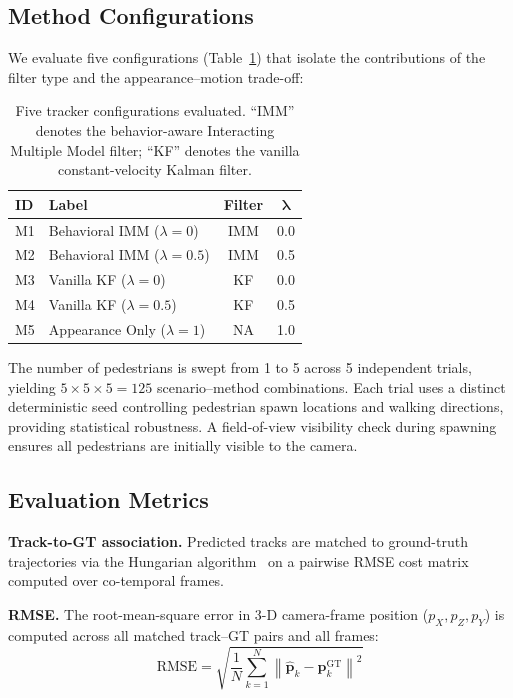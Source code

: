 \documentclass[conference]{IEEEtran}
\begin{document}
\subsection{Method Configurations}
We evaluate five configurations (Table~\ref{tab:methods}) that isolate the contributions of the filter type and the appearance--motion trade-off:

\begin{table}[!t]
\centering
\caption{Five tracker configurations evaluated. ``IMM'' denotes the behavior-aware Interacting Multiple Model filter; ``KF'' denotes the vanilla constant-velocity Kalman filter.}
\label{tab:methods}
\begin{tabular}{@{}llcc@{}}
\toprule
\textbf{ID} & \textbf{Label} & \textbf{Filter} & $\bm{\lambda}$ \\
\midrule
M1 & Behavioral IMM ($\lambda{=}0$)    & IMM & 0.0 \\
M2 & Behavioral IMM ($\lambda{=}0.5$)  & IMM & 0.5 \\
M3 & Vanilla KF ($\lambda{=}0$)        & KF  & 0.0 \\
M4 & Vanilla KF ($\lambda{=}0.5$)      & KF  & 0.5 \\
M5 & Appearance Only ($\lambda{=}1$)    & NA  & 1.0 \\
\bottomrule
\end{tabular}
\end{table}

The number of pedestrians is swept from 1 to 5 across 5 independent trials, yielding $5 \times 5 \times 5 = 125$ scenario--method combinations. Each trial uses a distinct deterministic seed controlling pedestrian spawn locations and walking directions, providing statistical robustness. A field-of-view visibility check during spawning ensures all pedestrians are initially visible to the camera.

\subsection{Evaluation Metrics}

\textbf{Track-to-GT association.} Predicted tracks are matched to ground-truth trajectories via the Hungarian algorithm~\cite{kuhn1955hungarian} on a pairwise RMSE cost matrix computed over co-temporal frames.

\textbf{RMSE.} The root-mean-square error in 3-D camera-frame position ($p_X, p_Z, p_Y$) is computed across all matched track--GT pairs and all frames:
\begin{equation}
\text{RMSE} = \sqrt{\frac{1}{N}\sum_{k=1}^{N} \left\|\hat{\mathbf{p}}_k - \mathbf{p}_k^{\text{GT}}\right\|^2}
\end{equation}
\end{document}
